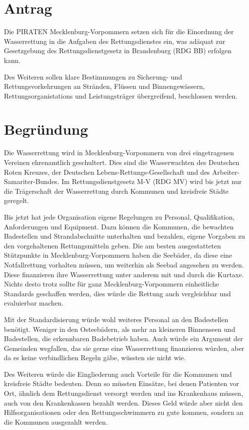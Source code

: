 \section{Antrag}

Die PIRATEN Mecklenburg-Vorpommern setzen sich für die Einordnung der Wasserrettung in die Aufgaben des Rettungsdienstes ein, was adäquat zur Gesetzgebung des Rettungsdienstgesetz in Brandenburg (RDG BB) erfolgen kann.

Des Weiteren sollen klare Bestimmungen zu Sicherung- und Rettungsvorkehrungen an Stränden, Flüssen und Binnengewässern, Rettungsorganistations und Leistungsträger übergreifend, beschlossen werden.

\section{Begründung}

Die Wasserrettung wird in Mecklenburg-Vorpommern von drei eingetragenen Vereinen ehrenamtlich geschultert. Dies sind die Wasserwachten des Deutschen Roten Kreuzes, der Deutschen Lebens-Rettungs-Gesellschaft und des Arbeiter-Samariter-Bundes. Im Rettungsdienstgesetz M-V (RDG MV) wird bis jetzt nur die Trägerschaft der Wasserrettung durch Kommunen und kreisfreie Städte geregelt.

Bis jetzt hat jede Organisation eigene Regelungen zu Personal, Qualifikation, Anforderungen und Equipment. Dazu können die Kommunen, die bewachten Badestellen und Strandabschnitte unterhalten und bezahlen, eigene Vorgaben zu den vorgehaltenen Rettungsmitteln geben. Die am besten ausgestatteten Stützpunkte in Mecklenburg-Vorpommern haben die Seebäder, da diese eine Notfallrettung vorhalten müssen, um weiterhin als Seebad angesehen zu werden. Diese finanzieren ihre Wasserrettung unter anderem mit und durch die Kurtaxe. Nichts desto trotz sollte für ganz Mecklenburg-Vorpommern einheitliche Standards geschaffen werden, dies würde die Rettung auch vergleichbar und evaluierbar machen.

Mit der Standardisierung würde wohl weiteres Personal an den Badestellen benötigt. Weniger in den Osteebädern, als mehr an kleineren Binnenseen und Badestellen, die erkennbaren Badebetrieb haben. Auch würde ein Argument der Gemeinden wegfallen, das sie gerne eine Wasserrettung finanzieren würden, aber da es keine verbindlichen Regeln gäbe, wüssten sie nicht wie.

Des Weiteren würde die Eingliederung auch Vorteile für die Kommunen und kreisfreie Städte bedeuten. Denn so müssten Einsätze, bei denen Patienten vor Ort, ähnlich dem Rettungsdienst versorgt werden und ins Krankenhaus müssen, auch von den Krankenkassen bezahlt werden. Dieses Geld würde aber nicht den Hilfsorganisationen oder den Rettungsschwimmern zu gute kommen, sondern an die Kommunen ausgezahlt werden.

